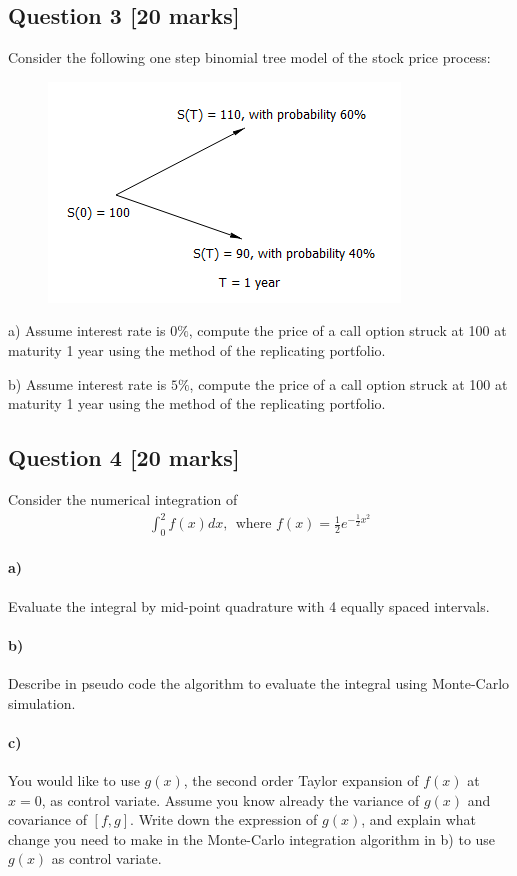 \documentclass[11pt,a4paper,hidelinks,fleqn]{article}            %
\begin{document}
\subsection*{Question 3 [20 marks]}
Consider the following one step binomial tree model of the stock price process:
\begin{figure}[h]
\includegraphics[scale=0.9]{./4}
\end{figure}

a) Assume interest rate is $0\%$, compute the price of a call option struck at 100 at maturity 1 year using the method of the replicating portfolio.

b) Assume interest rate is $5\%$, compute the price of a call option struck at 100 at maturity 1 year using the method of the replicating portfolio.


\subsection*{Question 4 [20 marks]} 
Consider the numerical integration of 
\begin{align*}
\int_0^{2} f(x) dx, ~~\text{where~} f(x) = \frac{1}{2} e^{-\frac12x^2}
\end{align*}

\paragraph{a)} Evaluate the integral by mid-point quadrature with 4 equally spaced intervals. 

\paragraph{b)} Describe in pseudo code the algorithm to evaluate the integral using Monte-Carlo simulation.
 

\paragraph{c)} You would like to use $g(x)$, the second order Taylor 
expansion of $f(x)$ at $x=0$, as control variate. 
Assume you know already the variance of $g(x)$ and covariance of $[f, g]$.
Write down the expression of $g(x)$, 
and explain what change you need to make in the Monte-Carlo integration algorithm in b) to use $g(x)$ as control variate.
\end{document}
